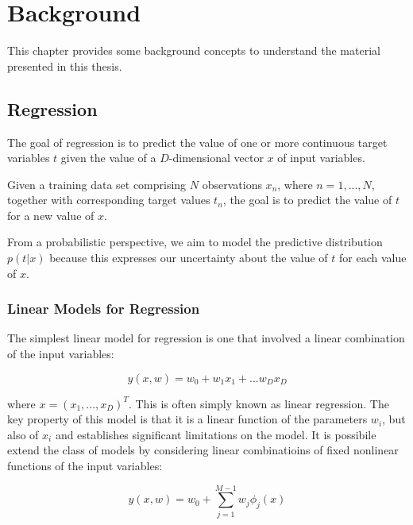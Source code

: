 \chapter{Background}
\label{chap:background}
This chapter provides some background concepts to understand the material 
presented in this thesis. 


\section{Regression}
The goal of regression is to predict the value of one or more continuous target variables $t$ given the value of a $D$-dimensional vector $x$ of input variables. \cite[]{bishop:2006:PRML}

\noindent Given a training data set comprising $N$ observations ${x_n}$, where $n = 1,...,N$,
together with corresponding target values ${t_n}$, the goal is to predict the value of $t$
for a new value of $x$.

\noindent From a probabilistic perspective, we aim to model the predictive distribution $p(t|x)$ because this expresses our uncertainty about the value of $t$ for each value of $x$.

\subsection{Linear Models for Regression}
\label{subsec:reglinuniv}

The simplest linear model for regression is one that involved a linear combination of the input variables:
\begin{Equation}[H]
	\centering
	\begin{equation}
	y(x,w)=w_0 + w_1x_1+...w_D x_D
	\end{equation}
	\label{eq:mathmodela}
\end{Equation}

\noindent where $x=(x_1,...,x_D)^T$. This is often simply known as linear regression. The key property of this model is that it is a linear function of the parameters $w_i$, but also of $x_i$ and establishes significant limitations on the model. It is possibile extend the class of models by considering linear combinatioins of fixed nonlinear functions of the input variables:
\begin{Equation}[H]
	\centering
	\begin{equation}
	y(x,w)=w_0 + \sum_{j=1}^{M-1}w_j \phi_j(x)
	\end{equation}
	\label{eq:mathmodela}
\end{Equation}

